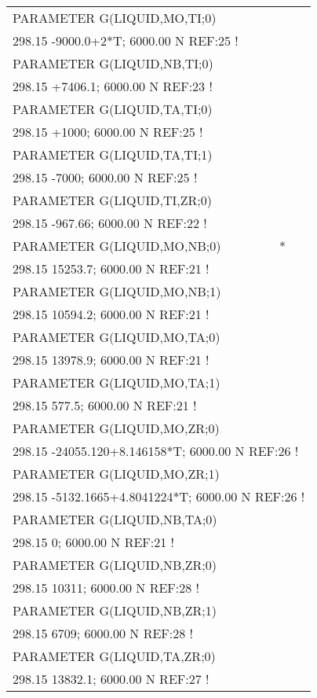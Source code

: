 \begin{longtable}[H]{ l l l }
	PARAMETER G(LIQUID,MO,TI;0) & & \\
	\multicolumn{3}{l}{298.15 -9000.0+2*T; 6000.00 N REF:25 !}\\
	PARAMETER G(LIQUID,NB,TI;0) & & \\
	\multicolumn{3}{l}{298.15 +7406.1; 6000.00 N REF:23 !}\\	 
	PARAMETER G(LIQUID,TA,TI;0) & & \\
	\multicolumn{3}{l}{298.15 +1000; 6000.00 N REF:25 !}\\
	PARAMETER G(LIQUID,TA,TI;1) & & \\
	\multicolumn{3}{l}{298.15 -7000; 6000.00 N REF:25 !}\\	 
	PARAMETER G(LIQUID,TI,ZR;0) & & \\
	\multicolumn{3}{l}{298.15 -967.66; 6000.00 N REF:22 !}\\ 
	PARAMETER G(LIQUID,MO,NB;0) & *& \\
	\multicolumn{3}{l}{298.15 15253.7; 6000.00 N REF:21 !}\\
	PARAMETER G(LIQUID,MO,NB;1) & & \\
	\multicolumn{3}{l}{298.15 10594.2; 6000.00 N REF:21 !}\\	 	 
	PARAMETER G(LIQUID,MO,TA;0) & & \\
	\multicolumn{3}{l}{298.15 13978.9; 6000.00 N REF:21 !}\\
	PARAMETER G(LIQUID,MO,TA;1) & & \\
	\multicolumn{3}{l}{298.15 577.5; 6000.00 N REF:21 !}\\
	PARAMETER G(LIQUID,MO,ZR;0) & & \\
	\multicolumn{3}{l}{298.15  -24055.120+8.146158*T; 6000.00  N REF:26 !}\\
	PARAMETER G(LIQUID,MO,ZR;1) & & \\
	\multicolumn{3}{l}{298.15  -5132.1665+4.8041224*T; 6000.00  N REF:26 !}\\	 
	PARAMETER G(LIQUID,NB,TA;0) & & \\
	\multicolumn{3}{l}{298.15 0; 6000.00 N REF:21 !}\\
	PARAMETER G(LIQUID,NB,ZR;0) & & \\
	\multicolumn{3}{l}{298.15 10311; 6000.00 N REF:28 !}\\
	PARAMETER G(LIQUID,NB,ZR;1) & & \\
	\multicolumn{3}{l}{298.15  6709; 6000.00 N REF:28 !}\\  
	PARAMETER G(LIQUID,TA,ZR;0) & & \\
	\multicolumn{3}{l}{298.15 13832.1; 6000.00 N REF:27 !}\\

\end{longtable}
